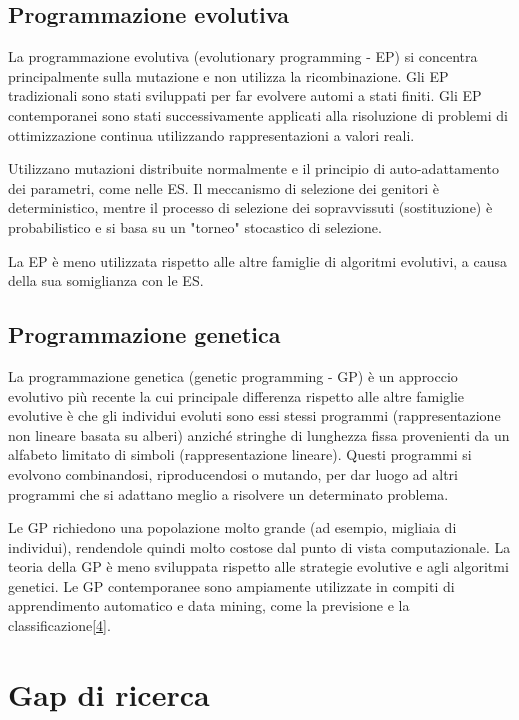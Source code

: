 \subsection{Programmazione evolutiva}

La programmazione evolutiva (evolutionary programming - EP) si concentra principalmente sulla mutazione e non utilizza la ricombinazione. Gli EP tradizionali sono stati sviluppati per far evolvere automi a stati finiti. Gli EP contemporanei sono stati successivamente applicati alla risoluzione di problemi di ottimizzazione continua utilizzando rappresentazioni a valori reali.

Utilizzano mutazioni distribuite normalmente e il principio di auto-adattamento dei parametri, come nelle ES. Il meccanismo di selezione dei genitori è deterministico, mentre il processo di selezione dei sopravvissuti (sostituzione) è probabilistico e si basa su un "torneo" stocastico di selezione.

La EP è meno utilizzata rispetto alle altre famiglie di algoritmi evolutivi, a causa della sua somiglianza con le ES.

\subsection{Programmazione genetica}

La programmazione genetica (genetic programming - GP) è un approccio evolutivo più recente la cui principale differenza rispetto alle altre famiglie evolutive è che gli individui evoluti sono essi stessi programmi (rappresentazione non lineare basata su alberi) anziché stringhe di lunghezza fissa provenienti da un alfabeto limitato di simboli (rappresentazione lineare). Questi programmi si evolvono combinandosi, riproducendosi o mutando, per dar luogo ad altri programmi che si adattano meglio a risolvere un determinato problema.

Le GP richiedono una popolazione molto grande (ad esempio, migliaia di individui), rendendole quindi molto costose dal punto di vista computazionale. La teoria della GP è meno sviluppata rispetto alle strategie evolutive e agli algoritmi genetici. Le GP contemporanee sono ampiamente utilizzate in compiti di apprendimento automatico e data mining, come la previsione e la classificazione[\hyperlink{bibliografia}{4}].

\section{Gap di ricerca}

